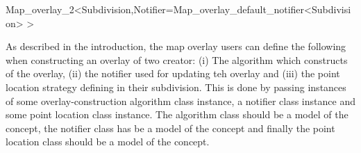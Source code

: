 \begin{ccRefClass}{Map_overlay_2<Subdivision,Notifier=Map_overlay_default_notifier<Subdivision> >}
        



\begin{ccAdvanced}


As described in the introduction, the map overlay users can define 
the following when constructing an overlay of two creator:
(i) The algorithm which constructs of the overlay, 
(ii) the notifier used for updating teh overlay and 
(iii) the point location strategy defining in their subdivision. 
This is done by passing instances of some overlay-construction 
algorithm class instance, a notifier class instance 
and some point location class instance. 
The algorithm class should be a model of the  concept,
the notifier class has be a model of the  concept
and finally the point location class should be a model of the
 concept. 


\end{ccAdvanced}
\end{ccRefClass}

